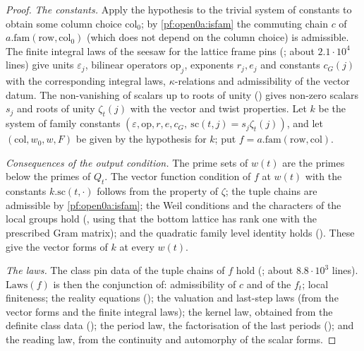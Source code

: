 \begin{proof}
\emph{The constants.} Apply the hypothesis to the trivial system of constants to obtain some column choice $\mathrm{col}_0$;
by \cref{pf:open0a:isfam} the commuting chain $c$ of $a.\mathrm{fam}(\mathrm{row},\mathrm{col}_0)$ (which does not depend
on the column choice) is admissible. The finite integral laws of the seesaw for the lattice frame pins
(; about $2.1\cdot10^4$ lines) give units
$\varepsilon_j$, bilinear operators $\mathrm{op}_j$, exponents $r_j,e_j$ and constants $c_G(j)$ with the corresponding
integral laws, $\kappa$-relations and admissibility of the vector datum. The non-vanishing of scalars up to roots of unity
() gives non-zero scalars $s_j$ and roots of unity
$\zeta_t(j)$ with the vector and twist properties. Let $k$ be the system of family constants
$(\varepsilon,\mathrm{op},r,e,c_G,\ \mathrm{sc}(t,j)=s_j\zeta_t(j))$, and let $(\mathrm{col},w_0,w,F)$ be given by the
hypothesis for $k$; put $f=a.\mathrm{fam}(\mathrm{row},\mathrm{col})$.

\emph{Consequences of the output condition.} The prime sets of $w(t)$ are the primes below the primes of $Q_t$. The vector
function condition of $f$ at $w(t)$ with the constants $k.\mathrm{sc}(t,\cdot)$ follows from the property of $\zeta$; the
tuple chains are admissible by \cref{pf:open0a:isfam}; the Weil conditions and the characters of the local groups hold
(, using that the bottom lattice has rank one with the prescribed
Gram matrix); and the quadratic family level identity holds ().
These give the vector forms of $k$ at every $w(t)$.

\emph{The laws.} The class pin data of the tuple chains of $f$ hold (;
about $8.8\cdot10^3$ lines). $\mathrm{Laws}(f)$ is then the conjunction of: admissibility of $c$ and of the $f_t$; local
finiteness; the reality equations (); the valuation and last-step laws (from
the vector forms and the finite integral laws); the kernel law, obtained from the definite class data
(); the period law, the factorisation of the last
periods (); and the reading law, from the continuity
and automorphy of the scalar forms.


\end{proof}
